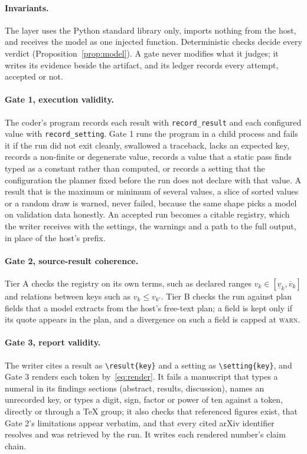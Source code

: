 \documentclass[sigconf,anonymous]{aamas}
\newcommand{\warn}{\textsc{warn}}
\begin{document}
\paragraph{Invariants.}
The layer uses the Python standard library only, imports nothing from the host, and receives the model as one injected function.
Deterministic checks decide every verdict (Proposition~\ref{prop:model}).
A gate never modifies what it judges; it writes its evidence beside the artifact, and its ledger records every attempt, accepted or not.

\paragraph{Gate 1, execution validity.}
The coder's program records each result with \texttt{record\_\allowbreak result} and each configured value with \texttt{record\_\allowbreak setting}.
Gate 1 runs the program in a child process and fails it if the run did not exit cleanly, swallowed a traceback, lacks an expected key, records a non-finite or degenerate value, records a value that a static pass finds typed as a constant rather than computed, or records a setting that the configuration the planner fixed before the run does not declare with that value.
A result that is the maximum or minimum of several values, a slice of sorted values or a random draw is warned, never failed, because the same shape picks a model on validation data honestly.
An accepted run becomes a citable registry, which the writer receives with the settings, the warnings and a path to the full output, in place of the host's prefix.

\paragraph{Gate 2, source-result coherence.}
Tier A checks the registry on its own terms, such as declared ranges $v_k \in [\underline{v}_k, \overline{v}_k]$ and relations between keys such as $v_{k} \le v_{k'}$.
Tier B checks the run against plan fields that a model extracts from the host's free-text plan; a field is kept only if its quote appears in the plan, and a divergence on such a field is capped at \warn{}.

\paragraph{Gate 3, report validity.}
The writer cites a result as \verb|\result{key}| and a setting as \verb|\setting{key}|, and Gate 3 renders each token by~\eqref{eq:render}.
It fails a manuscript that types a numeral in its findings sections (abstract, results, discussion), names an unrecorded key, or types a digit, sign, factor or power of ten against a token, directly or through a TeX group; it also checks that referenced figures exist, that Gate 2's limitations appear verbatim, and that every cited arXiv identifier resolves and was retrieved by the run.
It writes each rendered number's claim chain.
\end{document}
